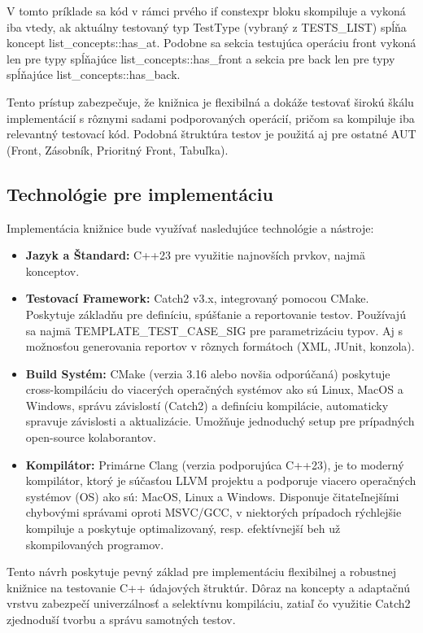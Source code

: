 \documentclass[11pt]{article}
\begin{document}
V tomto príklade sa kód v rámci prvého if constexpr bloku skompiluje a vykoná iba vtedy, ak aktuálny testovaný typ TestType (vybraný z TESTS\_LIST) spĺňa koncept list\_concepts::has\_at. Podobne sa sekcia testujúca operáciu front vykoná len pre typy spĺňajúce list\_concepts::has\_front a sekcia pre back len pre typy spĺňajúce list\_concepts::has\_back.

Tento prístup zabezpečuje, že knižnica je flexibilná a dokáže testovať širokú škálu implementácií s rôznymi sadami podporovaných operácií, pričom sa kompiluje iba relevantný testovací kód. Podobná štruktúra testov je použitá aj pre ostatné AUT (Front, Zásobník, Prioritný Front, Tabuľka).

\subsection{Technológie pre implementáciu}

Implementácia knižnice bude využívať nasledujúce technológie a nástroje:

\begin{itemize}
  \item \textbf{Jazyk a Štandard:} C++23 pre využitie najnovších prvkov, najmä konceptov.
  \item \textbf{Testovací Framework:} Catch2 v3.x, integrovaný pomocou CMake. Poskytuje základňu pre definíciu, spúšťanie a reportovanie testov. Používajú sa najmä TEMPLATE\_TEST\_CASE\_SIG pre parametrizáciu typov. Aj s možnosťou generovania reportov v rôznych formátoch (XML, JUnit, konzola).
  \item \textbf{Build Systém:} CMake (verzia 3.16 alebo novšia odporúčaná) poskytuje cross-kompiláciu do viacerých operačných systémov ako sú Linux, MacOS a Windows, správu závislostí (Catch2) a definíciu kompilácie, automaticky spravuje závislosti a aktualizácie. Umožňuje jednoduchý setup pre prípadných open-source kolaborantov.
  \item \textbf{Kompilátor:} Primárne Clang (verzia podporujúca C++23), je to moderný kompilátor, ktorý je súčasťou LLVM projektu a podporuje viacero operačných systémov (OS) ako sú: MacOS, Linux a Windows. Disponuje čitateľnejšími chybovými správami oproti MSVC/GCC, v niektorých prípadoch rýchlejšie kompiluje a poskytuje optimalizovaný, resp. efektívnejší beh už skompilovaných programov.
\end{itemize}

Tento návrh poskytuje pevný základ pre implementáciu flexibilnej a robustnej knižnice na testovanie C++ údajových štruktúr. Dôraz na koncepty a adaptačnú vrstvu zabezpečí univerzálnosť a selektívnu kompiláciu, zatiaľ čo využitie Catch2 zjednoduší tvorbu a správu samotných testov.
\end{document}
